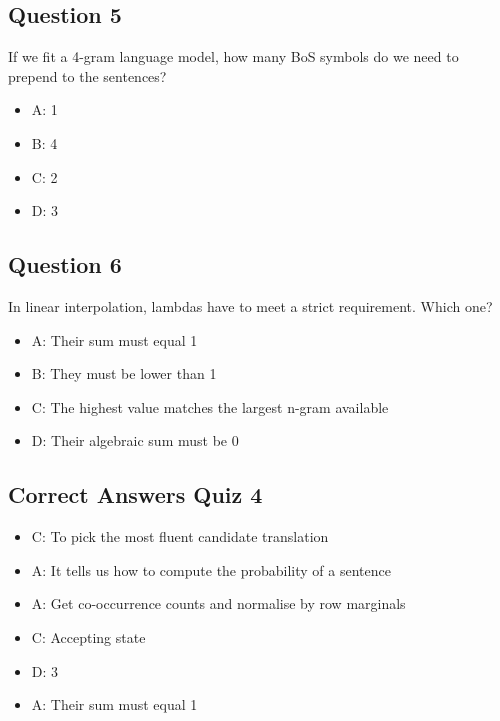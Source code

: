 \documentclass[
  11pt,
  british,
]{article}
\providecommand{\tightlist}{%
  \setlength{\itemsep}{0pt}\setlength{\parskip}{0pt}}
\begin{document}
\hypertarget{question-5-3}{%
\subsection{Question 5}\label{question-5-3}}

If we fit a 4-gram language model, how many BoS symbols do we need to
prepend to the sentences?

\begin{itemize}
\tightlist
\item
  A: 1
\item
  B: 4
\item
  C: 2
\item
  D: 3
\end{itemize}

\hypertarget{question-6-3}{%
\subsection{Question 6}\label{question-6-3}}

In linear interpolation, lambdas have to meet a strict requirement.
Which one?

\begin{itemize}
\tightlist
\item
  A: Their sum must equal 1
\item
  B: They must be lower than 1
\item
  C: The highest value matches the largest n-gram available
\item
  D: Their algebraic sum must be 0
\end{itemize}

\hypertarget{correct-answers-quiz-4}{%
\subsection{Correct Answers Quiz 4}\label{correct-answers-quiz-4}}

\begin{itemize}
\tightlist
\item
  C: To pick the most fluent candidate translation
\item
  A: It tells us how to compute the probability of a sentence
\item
  A: Get co-occurrence counts and normalise by row marginals
\item
  C: Accepting state
\item
  D: 3
\item
  A: Their sum must equal 1
\end{itemize}
\end{document}
